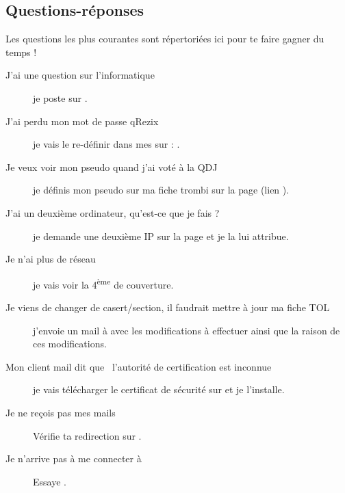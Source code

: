
\subsection{Questions-réponses}

Les questions les plus courantes sont répertoriées ici pour te faire gagner du temps !

\begin{description}

\item[J'ai une question sur l'informatique] je poste sur .

\item[J'ai perdu mon mot de passe qRezix] je vais le re-définir dans mes   sur \fkz :\linebreak{} .

\item[Je veux voir mon pseudo quand j'ai voté à la QDJ] je définis mon pseudo sur ma fiche trombi sur la page  (lien ).

\item[J'ai un deuxième ordinateur, qu'est-ce que je fais ?] je demande une deuxième IP sur la page \linebreak{}  et je la lui attribue.

\item[Je n'ai plus de réseau] je vais voir la 4\textsuperscript{ème} de couverture.

\item[Je viens de changer de casert/section, il faudrait mettre à jour ma fiche TOL] j'envoie un mail à  avec les modifications à effectuer ainsi que la raison de ces
modifications.

\item[Mon client mail dit que \guillemotleft~l'autorité de certification est inconnue~\guillemotright ] je vais télécharger le certificat de sécurité sur  et je l'installe.

\item[Je ne reçois pas mes mails] Vérifie ta redirection sur .

\item[Je n'arrive pas à me connecter à ] Essaye .


\end{description}
